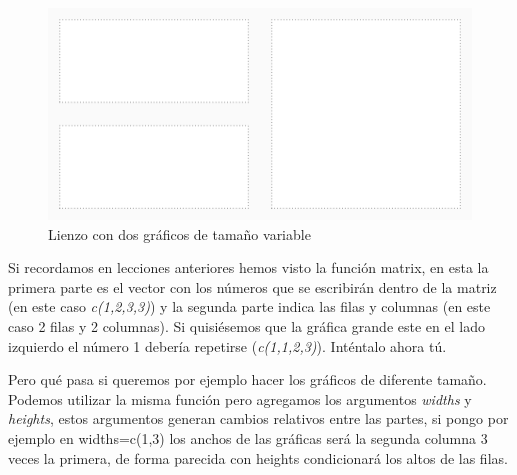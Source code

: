 \documentclass[]{article}
\begin{document}
\begin{figure}

{\centering \includegraphics{index_files/figure-latex/unnamed-chunk-5-1} 

}

\caption{Lienzo con dos gráficos de tamaño variable}\label{fig:unnamed-chunk-5}
\end{figure}

Si recordamos en lecciones anteriores hemos visto la función matrix, en
esta la primera parte es el vector con los números que se escribirán
dentro de la matriz (en este caso \emph{c(1,2,3,3)}) y la segunda parte
indica las filas y columnas (en este caso 2 filas y 2 columnas). Si
quisiésemos que la gráfica grande este en el lado izquierdo el número 1
debería repetirse (\emph{c(1,1,2,3)}). Inténtalo ahora tú.

Pero qué pasa si queremos por ejemplo hacer los gráficos de diferente
tamaño. Podemos utilizar la misma función pero agregamos los argumentos
\emph{widths} y \emph{heights}, estos argumentos generan cambios
relativos entre las partes, si pongo por ejemplo en widths=c(1,3) los
anchos de las gráficas será la segunda columna 3 veces la primera, de
forma parecida con heights condicionará los altos de las filas.
\end{document}
